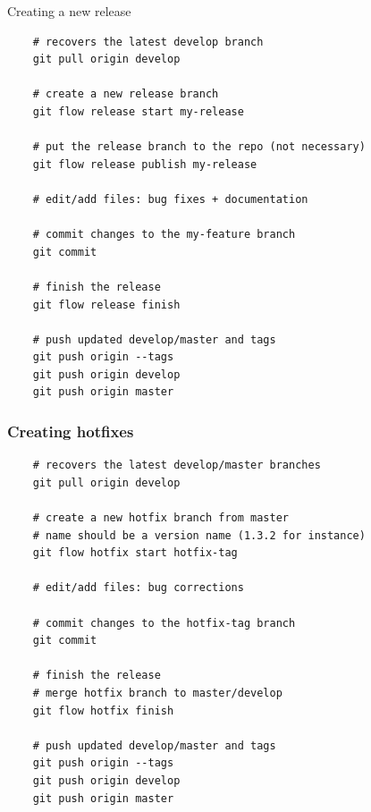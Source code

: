 \documentclass[svgnames]{beamer}
\begin{document}
\begin{frame}[fragile]{Creating a new release}

    \begin{lstlisting}
    # recovers the latest develop branch
    git pull origin develop

    # create a new release branch
    git flow release start my-release

    # put the release branch to the repo (not necessary)
    git flow release publish my-release 

    # edit/add files: bug fixes + documentation

    # commit changes to the my-feature branch
    git commit 

    # finish the release
    git flow release finish

    # push updated develop/master and tags
    git push origin --tags
    git push origin develop
    git push origin master
    \end{lstlisting}
\end{frame}

\begin{frame}[fragile]
    \frametitle{Creating hotfixes}
    \begin{lstlisting}
    # recovers the latest develop/master branches
    git pull origin develop

    # create a new hotfix branch from master
    # name should be a version name (1.3.2 for instance)
    git flow hotfix start hotfix-tag

    # edit/add files: bug corrections

    # commit changes to the hotfix-tag branch
    git commit 

    # finish the release
    # merge hotfix branch to master/develop
    git flow hotfix finish

    # push updated develop/master and tags
    git push origin --tags
    git push origin develop
    git push origin master
    \end{lstlisting}
\end{frame}
\end{document}
